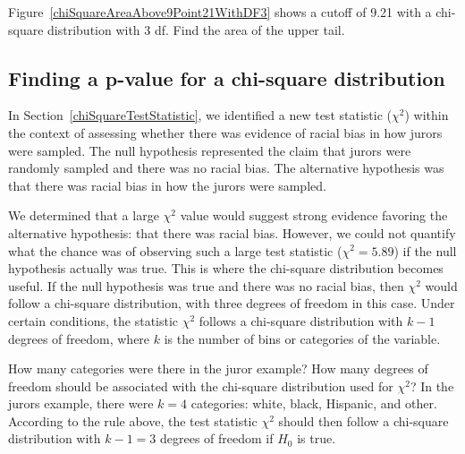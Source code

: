 \begin{exercisewrap}
\begin{nexercise}
Figure~\ref{chiSquareAreaAbove9Point21WithDF3} shows a cutoff of 9.21 with a chi-square distribution with 3 df. Find the area of the upper tail.\footnotemark
\end{nexercise}
\end{exercisewrap}

\subsection{Finding a p-value for a chi-square distribution}
\label{pValueForAChiSquareTest}

In Section~\ref{chiSquareTestStatistic}, we identified a new test statistic ($\chi^2$) within the context of assessing whether there was evidence of racial bias in how jurors were sampled. The null hypothesis represented the claim that jurors were randomly sampled and there was no racial bias. The alternative hypothesis was that there was racial bias in how the jurors were sampled.

We determined that a large $\chi^2$ value would suggest strong evidence favoring the alternative hypothesis: that there was racial bias. However, we could not quantify what the chance was of observing such a large test statistic ($\chi^2=5.89$) if the null hypothesis actually was true. This is where the chi-square distribution becomes useful. If the null hypothesis was true and there was no racial bias, then $\chi^2$ would follow a chi-square distribution, with three degrees of freedom in this case. Under certain conditions, the statistic $\chi^2$ follows a chi-square distribution with $k-1$ degrees of freedom, where $k$ is the number of bins or categories of the variable.

\begin{examplewrap}
\begin{nexample}{How many categories were there in the juror example? How many degrees of freedom should be associated with the chi-square distribution used for $\chi^2$?}
In the jurors example, there were $k=4$ categories: white, black, Hispanic, and other. According to the rule above, the test statistic $\chi^2$ should then follow a chi-square distribution with $k-1 = 3$ degrees of freedom if $H_0$ is true.
\end{nexample}
\end{examplewrap}

